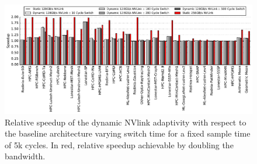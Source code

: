 







 \begin{figure}[tp]
    \centering
    \includegraphics[width=1.0\textwidth]{figures/plot_nvlink_switch_time_sample_time5000.pdf}
    \caption{Relative speedup of the dynamic NVlink adaptivity with respect to
	the baseline architecture varying switch time for a fixed sample time
of 5k cycles. In red, relative speedup achievable by doubling the bandwidth.}
    \label{fig:switchtime}
\end{figure}
